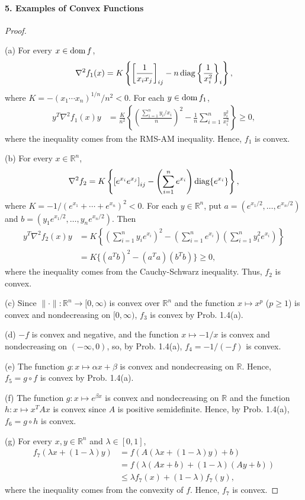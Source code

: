   \paragraph{5. Examples of Convex Functions}
  \begin{proof}
    $\,$\par
    (a) For every $x\in\operatorname{dom} f$,
    \[
      \nabla^2f_1(x)=
      K\left\{\left[\frac{1}{x_ix_j}\right]_{ij}
      -n\operatorname{diag}\left\{\frac{1}{x_i^2}\right\}_i\right\},
    \]
    where $K=-(x_1\cdots x_n)^{1/n}/n^2<0$. For each $y\in\operatorname{dom} f_1$,
    \begin{align*}
      y^T\nabla^2f_1(x)y
      &=\frac{K}{n^2}\left\{\left(\frac{\sum_{1=1}^n y_i/x_i}{n}\right)^2
        -\frac{1}{n}\sum_{i=1}^n\frac{y_i^2}{x_i^2}\right\}
      \ge 0,
    \end{align*}
    where the inequality comes from the RMS-AM inequality. Hence, $f_1$ is 
    convex.\par
    (b) For every $x\in\mathbb{R}^n$,
    \[
      \nabla^2f_2= 
      K\left\{\left[e^{x_i}e^{x_j}\right]_{ij}
      -\left(\sum_{i=1}^ne^{x_i}\right)\operatorname{diag}\{e^{x_i}\}\right\},
    \]
    where $K=-1/(e^{x_1}+\cdots+e^{x_n})^2<0$. For each $y\in\mathbb{R}^n$,
    put $a=(e^{x_1/2},\dots,e^{x_n/2})$ and $b=(y_1e^{x_1/2},\dots,
    y_ne^{x_n/2})$. Then
    \begin{align*}
      y^T\nabla^2f_2(x)y
      &=K\left\{\left(\sum_{i=1}^ny_ie^{x_i}\right)^2
       -\left(\sum_{i=1}^ne^{x_i}\right)
        \left(\sum_{i=1}^ny_i^2e^{x_i}\right)\right\}\\
      &=K\{(a^Tb)^2-(a^Ta)(b^Tb)\}
      \ge 0,
    \end{align*}
    where the inequality comes from the Cauchy-Schwarz inequality. Thus, $f_2$
    is convex.\par
    (c) Since $\|\cdot\|:\mathbb{R}^n\to[0,\infty)$ is convex over 
    $\mathbb{R}^n$ and the function $x\mapsto x^p$ ($p\ge 1$) is convex and 
    nondecreasing on $[0,\infty)$, $f_3$ is convex by Prob. 1.4(a).\par
    (d) $-f$ is convex and negative, and the function $x\mapsto -1/x$ is convex
    and nondecreasing on $(-\infty,0)$, so, by Prob. 1.4(a), $f_4=-1/(-f)$
    is convex.\par
    (e) The function $g:x\mapsto \alpha x+\beta$ is convex and nondecreasing on
    $\mathbb{R}$. Hence, $f_5=g\circ f$ is convex by Prob. 1.4(a).\par
    (f) The function $g:x\mapsto e^{\beta x}$ is convex and nondecreasing on 
    $\mathbb{R}$ and the function $h:x\mapsto x^TAx$ is convex since $A$ is
    positive semidefinite. Hence, by Prob. 1.4(a), $f_6=g\circ h$ is convex.
    \par
    (g) For every $x,y\in\mathbb{R}^n$ and $\lambda\in[0,1]$,
    \begin{align*}
      f_7(\lambda x+(1-\lambda)y)
      &=f(A(\lambda x+(1-\lambda)y)+b)\\
      &=f(\lambda(Ax+b)+(1-\lambda)(Ay+b))\\
      &\le\lambda f_7(x)+(1-\lambda)f_7(y),
    \end{align*}
    where the inequality comes from the convexity of $f$. Hence, $f_7$ is 
    convex.
  \end{proof}
  

